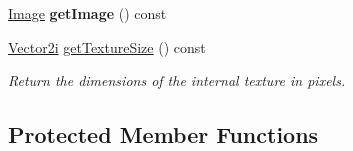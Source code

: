 \begin{Indent}
\begin{DoxyCompactItemize}
\mbox{\hyperlink{classrev_1_1_image}{Image}} {\bfseries get\+Image} () const
\item 
\mbox{\label{classrev_1_1_texture_packer_a0f2eacc89783a649a953030c400cd056}} 
\mbox{\hyperlink{classrev_1_1_vector}{Vector2i}} \mbox{\hyperlink{classrev_1_1_texture_packer_a0f2eacc89783a649a953030c400cd056}{get\+Texture\+Size}} () const
\begin{DoxyCompactList}\small\item\em Return the dimensions of the internal texture in pixels. \end{DoxyCompactList}\end{DoxyCompactItemize}
\end{Indent}
\subsection*{Protected Member Functions}
